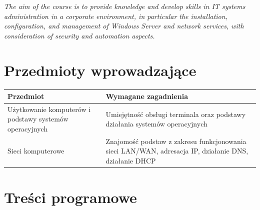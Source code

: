 \documentclass[12pt, a4paper]{article}
\newcommand{\thdrule}{\noalign{\global\setlength{\extrarowheight}{0pt}}}
\newcommand{\thdend}{\noalign{\global\setlength{\extrarowheight}{3pt}}}
\begin{document}
\textit{The aim of the course is to provide knowledge and develop skills in IT systems administration in a corporate environment, in particular the installation, configuration, and management of Windows Server and network services, with consideration of security and automation aspects.}


\section{Przedmioty wprowadzające}

{\scriptsize
\begin{tabularx}{\textwidth}{m{5cm}Y}
\thdrule\toprule
{} {\color{white}\textbf{Przedmiot}} & {\color{white}\textbf{Wymagane zagadnienia}} \\
\midrule\thdend
   Użytkowanie komputerów i podstawy systemów operacyjnych & Umiejętność obsługi terminala oraz podstawy działania systemów operacyjnych \\
   Sieci komputerowe & Znajomość podstaw z zakresu funkcjonowania sieci LAN/WAN, adresacja IP, działanie DNS, działanie DHCP \\
\bottomrule
\end{tabularx}}

\section{Treści programowe}
\end{document}
